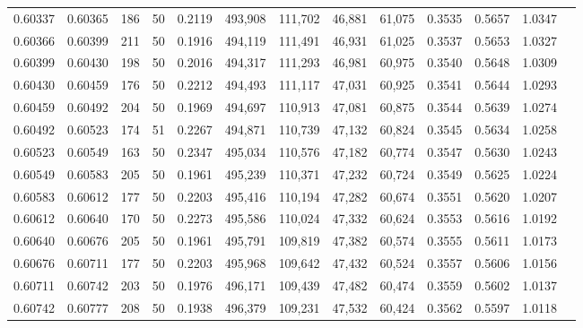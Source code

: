 \begin{tabular}{rrrrrrrrrrrrr}
0.60337 & 0.60365 &   186 &  50 &                                     0.2119 & 493,908 & 111,702 &  46,881 &  61,075 & 0.3535 & 0.5657 & 1.0347 \\
0.60366 & 0.60399 &   211 &  50 &                                     0.1916 & 494,119 & 111,491 &  46,931 &  61,025 & 0.3537 & 0.5653 & 1.0327 \\
0.60399 & 0.60430 &   198 &  50 &                                     0.2016 & 494,317 & 111,293 &  46,981 &  60,975 & 0.3540 & 0.5648 & 1.0309 \\
0.60430 & 0.60459 &   176 &  50 &                                     0.2212 & 494,493 & 111,117 &  47,031 &  60,925 & 0.3541 & 0.5644 & 1.0293 \\
0.60459 & 0.60492 &   204 &  50 &                                     0.1969 & 494,697 & 110,913 &  47,081 &  60,875 & 0.3544 & 0.5639 & 1.0274 \\
0.60492 & 0.60523 &   174 &  51 &                                     0.2267 & 494,871 & 110,739 &  47,132 &  60,824 & 0.3545 & 0.5634 & 1.0258 \\
0.60523 & 0.60549 &   163 &  50 &                                     0.2347 & 495,034 & 110,576 &  47,182 &  60,774 & 0.3547 & 0.5630 & 1.0243 \\
0.60549 & 0.60583 &   205 &  50 &                                     0.1961 & 495,239 & 110,371 &  47,232 &  60,724 & 0.3549 & 0.5625 & 1.0224 \\
0.60583 & 0.60612 &   177 &  50 &                                     0.2203 & 495,416 & 110,194 &  47,282 &  60,674 & 0.3551 & 0.5620 & 1.0207 \\
0.60612 & 0.60640 &   170 &  50 &                                     0.2273 & 495,586 & 110,024 &  47,332 &  60,624 & 0.3553 & 0.5616 & 1.0192 \\
0.60640 & 0.60676 &   205 &  50 &                                     0.1961 & 495,791 & 109,819 &  47,382 &  60,574 & 0.3555 & 0.5611 & 1.0173 \\
0.60676 & 0.60711 &   177 &  50 &                                     0.2203 & 495,968 & 109,642 &  47,432 &  60,524 & 0.3557 & 0.5606 & 1.0156 \\
0.60711 & 0.60742 &   203 &  50 &                                     0.1976 & 496,171 & 109,439 &  47,482 &  60,474 & 0.3559 & 0.5602 & 1.0137 \\
0.60742 & 0.60777 &   208 &  50 &                                     0.1938 & 496,379 & 109,231 &  47,532 &  60,424 & 0.3562 & 0.5597 & 1.0118 \\

\end{tabular}
